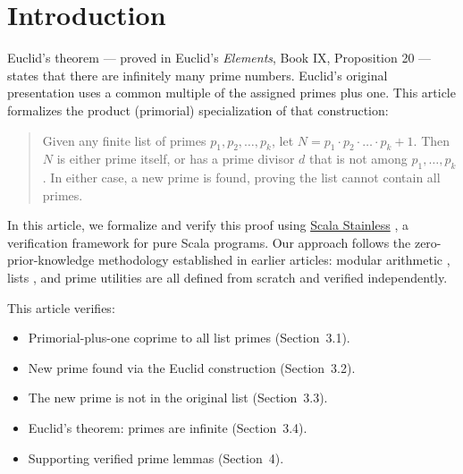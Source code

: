 \section{Introduction}
\label{sec:introduction}

Euclid's theorem --- proved in Euclid's \emph{Elements}, Book IX,
Proposition 20 \cite{euclidelements} --- states that there are infinitely
many prime numbers. Euclid's original presentation uses a common multiple
of the assigned primes plus one. This article formalizes the product
(primorial) specialization of that construction:

\begin{quote}
Given any finite list of primes $p_1, p_2, \dots, p_k$, let
$N = p_1 \cdot p_2 \cdot \dots \cdot p_k + 1$.
Then $N$ is either prime itself, or has a prime divisor $d$ that is not
among $p_1, \dots, p_k$.
In either case, a new prime is found, proving the list cannot contain all
primes.
\end{quote}

In this article, we formalize and verify this proof using
\href{https://epfl-lara.github.io/stainless/intro.html}{Scala Stainless}
\cite{hamza2019systemfr}, a verification framework for pure Scala programs.
Our approach follows the zero-prior-knowledge methodology established in
earlier articles: modular arithmetic \cite{mata2026modulo}, lists
\cite{mata2026lists}, and prime utilities are all defined from scratch and
verified independently.

This article verifies:

\begin{itemize}
  \item Primorial-plus-one coprime to all list primes (Section~3.1).
  \item New prime found via the Euclid construction (Section~3.2).
  \item The new prime is not in the original list (Section~3.3).
  \item Euclid's theorem: primes are infinite (Section~3.4).
  \item Supporting verified prime lemmas (Section~4).
\end{itemize}

